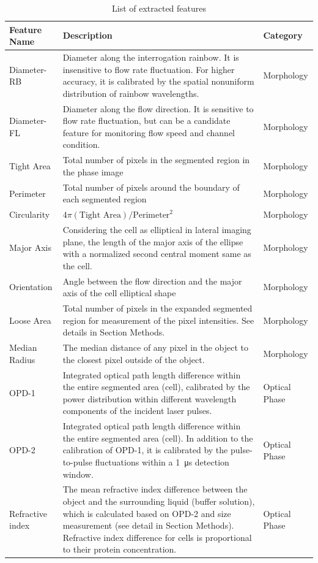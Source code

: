 \documentclass[aps,pra,reprint,superscriptaddress]{revtex4-1}
\begin{document}
\begin{table}[hb!]
\caption{\label{tbl:Features} List of extracted features}
\begin{tabular}{|p{}|p{}|p{}|}
\hline
Feature Name	 &Description	 &Category\\ \hline
Diameter-RB	 &Diameter along the interrogation rainbow. It is insensitive to flow rate fluctuation. For higher accuracy, it is calibrated by the spatial nonuniform distribution of rainbow wavelengths. 	 &Morphology\\ \hline
Diameter-FL	 &Diameter along the flow direction. It is sensitive to flow rate fluctuation, but can be a candidate feature for monitoring flow speed and channel condition.	 &Morphology\\ \hline
Tight Area	 &Total number of pixels in the segmented region in the phase image	 &Morphology\\ \hline
Perimeter	 &Total number of pixels around the boundary of each segmented region	 &Morphology\\ \hline
Circularity	 &$4\pi (\text{Tight Area}) / \text{Perimeter}^2$  &Morphology\\ \hline
Major Axis 	 &Considering the cell as elliptical in lateral imaging plane, the length of the major axis of the ellipse with a normalized second central moment same as the cell.	 &Morphology\\ \hline
Orientation	 &Angle between the flow direction and the major axis of the cell elliptical shape	 &Morphology\\ \hline
Loose Area	 &Total number of pixels in the expanded segmented region for measurement of the pixel intensities. See details in Section Methods.	 &Morphology\\ \hline
Median Radius	 &The median distance of any pixel in the object to the closest pixel outside of the object.	 &Morphology\\ \hline
OPD-1	 &Integrated optical path length difference within the entire segmented area (cell), calibrated by the power distribution within different wavelength components of the incident laser pulses.	 &Optical Phase\\ \hline
OPD-2	 &Integrated optical path length difference within the entire segmented area (cell). In addition to the calibration of OPD-1, it is calibrated by the pulse-to-pulse fluctuations within a \SI{1}{\micro\second} detection window.	 &Optical Phase\\ \hline
Refractive index	 &The mean refractive index difference between the object and the surrounding liquid (buffer solution), which is calculated based on OPD-2 and size measurement (see detail in Section Methods). Refractive index difference for cells is proportional to their protein concentration.	 &Optical Phase\\ \hline

\end{tabular}
\end{table}
\end{document}

